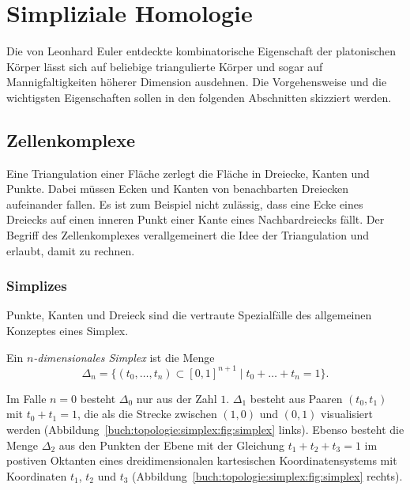 %
%
\section{Simpliziale Homologie
\label{buch:topologie:section:simplex}}
%
Die von Leonhard Euler entdeckte kombinatorische Eigenschaft der platonischen
%
Körper lässt sich auf beliebige triangulierte Körper und sogar
%
auf Mannigfaltigkeiten höherer Dimension ausdehnen.
Die Vorgehensweise und die wichtigsten Eigenschaften sollen in den
folgenden Abschnitten skizziert werden.

%
%
\subsection{Zellenkomplexe}
Eine Triangulation einer Fläche zerlegt die Fläche in Dreiecke,
Kanten und Punkte.
%
Dabei müssen Ecken und Kanten von benachbarten Dreiecken aufeinander
fallen.
Es ist zum Beispiel nicht zulässig, dass eine Ecke eines Dreiecks
auf einen inneren Punkt einer Kante eines Nachbardreiecks fällt.
Der Begriff des Zellenkomplexes verallgemeinert die Idee
der Triangulation und erlaubt, damit zu rechnen.
%
%

%
%
\subsubsection{Simplizes}
Punkte, Kanten und Dreieck sind die vertraute Spezialfälle des allgemeinen
%
%
%
Konzeptes eines Simplex.
%

\begin{definition}[Simplex]
%
Ein \emph{$n$-dimensionales Simplex} ist die Menge
%
%
\[
\Delta_n
=
\{
(t_0,\dots,t_n)
\subset
[0,1]^{n+1}
\mid
t_0+\dots+t_n=1
\}.
\]
\end{definition}

Im Falle $n=0$ besteht $\Delta_0$ nur aus der Zahl $1$.
$\Delta_1$ besteht aus Paaren $(t_0,t_1)$ mit $t_0+t_1=1$, die
als die Strecke zwischen $(1,0)$ und $(0,1)$ visualisiert
werden (Abbildung~\ref{buch:topologie:simplex:fig:simplex} links).
Ebenso besteht die Menge $\Delta_2$ aus den Punkten der Ebene mit
der Gleichung $t_1+t_2+t_3=1$ im postiven Oktanten eines
dreidimensionalen kartesischen Koordinatensystems mit Koordinaten
$t_1$, $t_2$ und $t_3$
(Abbildung~\ref{buch:topologie:simplex:fig:simplex} rechts).

